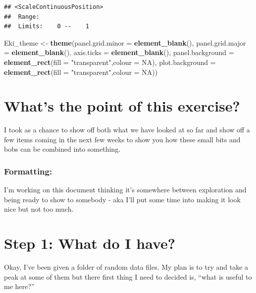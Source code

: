 \documentclass[
]{article}
\newenvironment{Shaded}{\begin{snugshade}}{\end{snugshade}}
\newcommand{\DataTypeTok}[1]{\textcolor[rgb]{0.13,0.29,0.53}{#1}}
\newcommand{\KeywordTok}[1]{\textcolor[rgb]{0.13,0.29,0.53}{\textbf{#1}}}
\newcommand{\NormalTok}[1]{#1}
\newcommand{\OtherTok}[1]{\textcolor[rgb]{0.56,0.35,0.01}{#1}}
\newcommand{\StringTok}[1]{\textcolor[rgb]{0.31,0.60,0.02}{#1}}
\begin{document}
\begin{verbatim}
## <ScaleContinuousPosition>
##  Range:  
##  Limits:    0 --    1
\end{verbatim}

\begin{Shaded}
\begin{Highlighting}[]
\NormalTok{Eki_theme <-}\StringTok{ }\KeywordTok{theme}\NormalTok{(}\DataTypeTok{panel.grid.minor =} \KeywordTok{element_blank}\NormalTok{(),}
                   \DataTypeTok{panel.grid.major =} \KeywordTok{element_blank}\NormalTok{(),}
                   \DataTypeTok{axis.ticks =} \KeywordTok{element_blank}\NormalTok{(),}
                   \DataTypeTok{panel.background =} \KeywordTok{element_rect}\NormalTok{(}\DataTypeTok{fill =} \StringTok{"transparent"}\NormalTok{,}\DataTypeTok{colour =} \OtherTok{NA}\NormalTok{),}
                   \DataTypeTok{plot.background =} \KeywordTok{element_rect}\NormalTok{(}\DataTypeTok{fill =} \StringTok{"transparent"}\NormalTok{,}\DataTypeTok{colour =} \OtherTok{NA}\NormalTok{))}
\end{Highlighting}
\end{Shaded}

\hypertarget{whats-the-point-of-this-exercise}{%
\section{What's the point of this
exercise?}\label{whats-the-point-of-this-exercise}}

I took as a chance to show off both what we have looked at so far and
show off a few items coming in the next few weeks to show you how these
small bits and bobs can be combined into something.

\hypertarget{formatting}{%
\subsubsection{Formatting:}\label{formatting}}

I'm working on this document thinking it's somewhere between exploration
and being ready to show to somebody - aka I'll put some time into making
it look nice but not too much.

\hypertarget{step-1-what-do-i-have}{%
\section{Step 1: What do I have?}\label{step-1-what-do-i-have}}

Okay, I've been given a folder of random data files. My plan is to try
and take a peak at some of them but there first thing I need to decided
is, ``what is useful to me here?''
\end{document}
